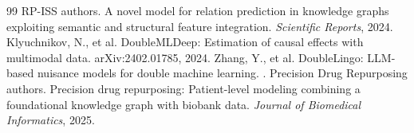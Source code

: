 \documentclass{article}
\theoremstyle{plain}
\theoremstyle{definition}
\theoremstyle{remark}
\begin{document}
\begin{thebibliography}{99}
 RP-ISS authors. \newblock A novel model for relation prediction in knowledge graphs exploiting semantic and structural feature integration. \newblock \emph{Scientific Reports}, 2024.
 Klyuchnikov, N., et al. \newblock DoubleMLDeep: Estimation of causal effects with multimodal data. \newblock arXiv:2402.01785, 2024.
 Zhang, Y., et al. \newblock DoubleLingo: LLM-based nuisance models for double machine learning. .
 Precision Drug Repurposing authors. \newblock Precision drug repurposing: Patient-level modeling combining a foundational knowledge graph with biobank data. \newblock \emph{Journal of Biomedical Informatics}, 2025.
\end{thebibliography}
\end{document}

